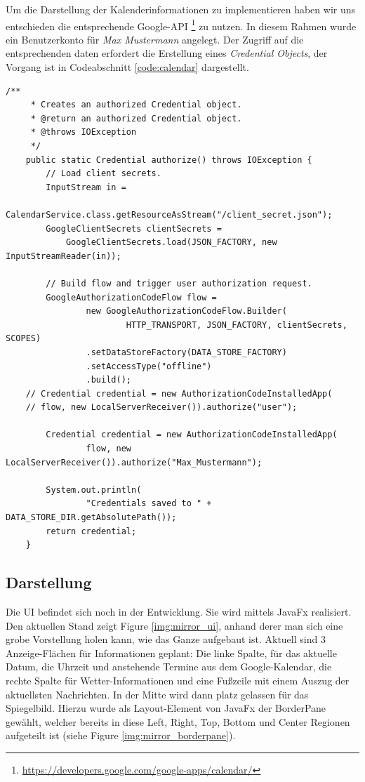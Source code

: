 Um die Darstellung der Kalenderinformationen zu implementieren haben wir uns entschieden die entsprechende Google-API \footnote{\url{https://developers.google.com/google-apps/calendar/}} zu nutzen. In diesem Rahmen wurde ein Benutzerkonto für \textit{Max Mustermann} angelegt. Der Zugriff auf die entsprechenden daten erfordert die Erstellung eines \textit{Credential Objects}, der Vorgang ist in Codeabschnitt \ref{code:calendar} dargestellt.

\begin{lstlisting}[float=htb,caption={CalendarService Klasse - Authorisierung des jeweiligen Anwenders},label=code:calendar]
    /**
     * Creates an authorized Credential object.
     * @return an authorized Credential object.
     * @throws IOException
     */
    public static Credential authorize() throws IOException {
        // Load client secrets.
        InputStream in =
            CalendarService.class.getResourceAsStream("/client_secret.json");
        GoogleClientSecrets clientSecrets =
            GoogleClientSecrets.load(JSON_FACTORY, new InputStreamReader(in));

        // Build flow and trigger user authorization request.
        GoogleAuthorizationCodeFlow flow =
                new GoogleAuthorizationCodeFlow.Builder(
                        HTTP_TRANSPORT, JSON_FACTORY, clientSecrets, SCOPES)
                .setDataStoreFactory(DATA_STORE_FACTORY)
                .setAccessType("offline")
                .build();
	// Credential credential = new AuthorizationCodeInstalledApp(
	// flow, new LocalServerReceiver()).authorize("user");

        Credential credential = new AuthorizationCodeInstalledApp(
                flow, new LocalServerReceiver()).authorize("Max_Mustermann");
        
        System.out.println(
                "Credentials saved to " + DATA_STORE_DIR.getAbsolutePath());
        return credential;
    }
\end{lstlisting}


\subsection{Darstellung}
\label{subsec:display}

Die UI befindet sich noch in der Entwicklung. Sie wird mittels JavaFx realisiert. Den aktuellen Stand zeigt Figure \ref{img:mirror_ui}, anhand derer man sich eine grobe Vorstellung holen kann, wie das Ganze aufgebaut ist. Aktuell sind 3 Anzeige-Flächen für Informationen geplant: Die linke Spalte, für das aktuelle Datum, die Uhrzeit und anstehende Termine aus dem Google-Kalendar, die rechte Spalte für Wetter-Informationen und eine Fußzeile mit einem Auszug der aktuellsten Nachrichten. In der Mitte wird dann platz gelassen für das Spiegelbild.
Hierzu wurde als Layout-Element von JavaFx der BorderPane gewählt, welcher bereits in diese Left, Right, Top, Bottom und Center Regionen aufgeteilt ist (siehe Figure \ref{img:mirror_borderpane}).


